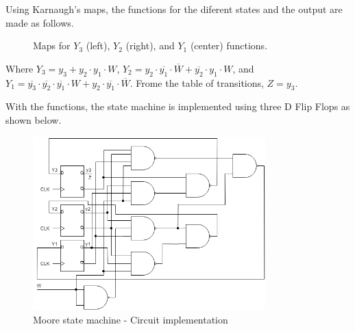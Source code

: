Using Karnaugh's maps, the functions for
the diferent states and the output are made
as follows.

\begin{figure}[H]
    \begin{center}
    \begin{Karnaugh}
    \end{Karnaugh}
    \begin{Karnaugh}
    \end{Karnaugh}
    \begin{Karnaugh}
    \end{Karnaugh}
    \caption{Maps for $Y_3$ (left), $Y_2$ (right), and $Y_1$ (center) functions.}
\end{center}
\end{figure}
Where $Y_3 = y_3 + y_2 \cdot y_1 \cdot W$, $Y_2 = y_2 \cdot \overline{y_1} \cdot \overline{W} + \overline{y_2} \cdot y_1 \cdot W$,
and $Y_1 = \overline{y_3} \cdot \overline{y_2} \cdot \overline{y_1} \cdot W + y_2 \cdot \overline{y_1} \cdot \overline{W}$.
Frome the table of transitions, $Z = y_3$.

With the functions, the state machine is 
implemented using three D Flip Flops as shown below.

\begin{figure}[H]
    \begin{centering}
    \includegraphics[width=0.8\textwidth]{Graficos2/2a_Compuertas_Moore.png}
    \par\end{centering}
    \caption{Moore state machine  - Circuit implementation}
\end{figure}

